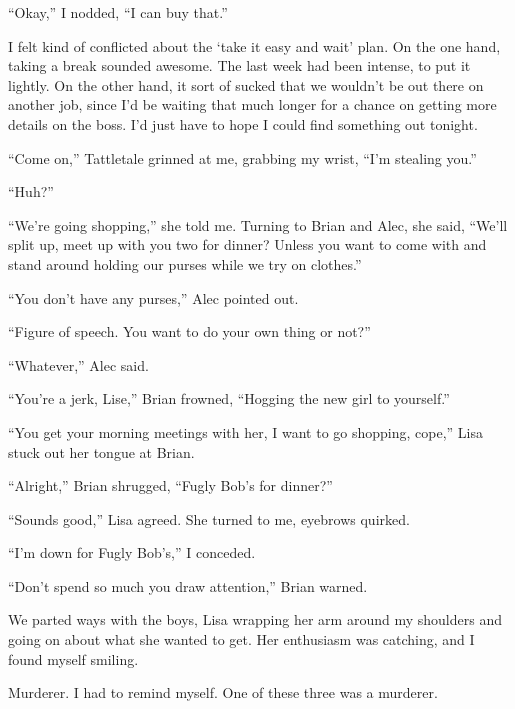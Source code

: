 ``Okay,'' I nodded, ``I can buy that.''



I felt kind of conflicted about the `take it easy and wait' plan.  On the one hand, taking a break sounded awesome.  The last week had been intense, to put it lightly.  On the other hand, it sort of sucked that we wouldn't be out there on another job, since I'd be waiting that much longer for a chance on getting more details on the boss.  I'd just have to hope I could find something out tonight.



``Come on,'' Tattletale grinned at me, grabbing my wrist, ``I'm stealing you.''



``Huh?''



``We're going shopping,'' she told me.  Turning to Brian and Alec, she said, ``We'll split up, meet up with you two for dinner?  Unless you want to come with and stand around holding our purses while we try on clothes.''



``You don't have any purses,'' Alec pointed out.



``Figure of speech.  You want to do your own thing or not?''



``Whatever,'' Alec said.



``You're a jerk, Lise,'' Brian frowned, ``Hogging the new girl to yourself.''



``You get your morning meetings with her, I want to go shopping, cope,'' Lisa stuck out her tongue at Brian.



``Alright,'' Brian shrugged, ``Fugly Bob's for dinner?''



``Sounds good,'' Lisa agreed.  She turned to me, eyebrows quirked.



``I'm down for Fugly Bob's,'' I conceded.



``Don't spend so much you draw attention,'' Brian warned.



We parted ways with the boys, Lisa wrapping her arm around my shoulders and going on about what she wanted to get.  Her enthusiasm was catching, and I found myself smiling.



Murderer.  I had to remind myself.  One of these three was a murderer.





